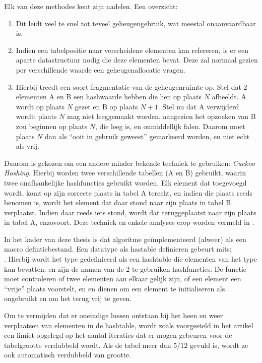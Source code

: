Elk van deze methodes kent zijn nadelen. Een overzicht: \begin{enumerate}
\item Dit leidt veel te snel tot teveel geheugengebruik, wat meestal onaanvaardbaar is.
\item Indien een tabelpositie naar verscheidene elementen kan refereren, is er een aparte datastructuur nodig die deze elementen bevat. Deze zal normaal gezien per verschillende waarde een geheugenallocatie vragen. 
\item Hierbij treedt een soort fragmentatie van de geheugenruimte op. Stel dat 2 elementen A en B een hashwaarde hebben die hen op plaats $N$ afbeeldt. A wordt op plaats $N$ gezet en B op plaats $N+1$. Stel nu dat A verwijderd wordt: plaats $N$ mag niet leeggemaakt worden, aangezien het opzoeken van B zou beginnen op plaats $N$, die leeg is, en onmiddellijk falen. Daarom moet plaats $N$ dan als ``ooit in gebruik geweest'' gemarkeerd worden, en niet echt als vrij.
\end{enumerate}

Daarom is gekozen om een andere minder bekende techniek te gebruiken: {\em Cuckoo Hashing}. Hierbij worden twee verschillende tabellen (A en B) gebruikt, waarin twee onafhankelijke hashfuncties gebruikt worden. Elk element dat toegevoegd wordt, komt op zijn correcte plaats in tabel A terecht, en indien die plaats reeds benomen is, wordt het element dat daar stond naar zijn plaats in tabel B verplaatst. Indien daar reeds iets stond, wordt dat teruggeplaatst naar zijn plaats in tabel A, enzovoort. Deze techniek en enkele analyses erop worden vermeld in \cite{cuckoo}.

In het kader van deze thesis is dat algoritme ge\"implementeerd (alweer) als een macro defintiebestand. Een datatype als hastable definieren gebeurt mits: \\
. Hierbij wordt het type  gedefinieerd als een hashtable die elementen van het type  kan bevatten.  en  zijn de namen van de 2 te gebruiken hashfuncties. De functie  moet controleren of twee elementen aan elkaar gelijk zijn,  of een element een ``vrije'' plaats voorstelt, en  en  dienen om een element te initialiseren als ongebruikt en om het terug vrij te geven.

Om te vermijden dat er oneindige lussen ontstaan bij het heen en weer verplaatsen van elementen in de hashtable, wordt zoals voorgesteld in het artikel een limiet opgelegd op het aantal iteraties dat er mogen gebeuren voor de tabelgrootte verdubbeld wordt. Als de tabel meer dan $5/12$ gevuld is, wordt ze ook automatisch verdubbeld van grootte.

